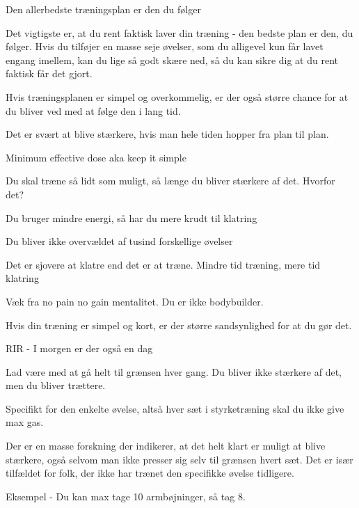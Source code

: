 \begin{multicols}{2}
\begin{tList}{Den allerbedste træningsplan er den du følger}
\item Det vigtigste er, at du rent faktisk laver din træning - den bedste plan er den, du følger. Hvis du tilføjer en masse seje øvelser, som du alligevel kun får lavet engang imellem, kan du lige så godt skære ned, så du kan sikre dig at du rent faktisk får det gjort.
\item Hvis træningsplanen er simpel og overkommelig, er der også større chance for at du bliver ved med at følge den i lang tid.
\item  Det er svært at blive stærkere, hvis man hele tiden hopper fra plan til plan.
\end{tList}



\begin{tList}{Minimum effective dose aka keep it simple}
\item Du skal træne så lidt som muligt, så længe du bliver stærkere af det. Hvorfor det?

\item Du bruger mindre energi, så har du mere krudt til klatring
\item Du bliver ikke overvældet af tusind forskellige øvelser
\item Det er sjovere at klatre end det er at træne. Mindre tid træning, mere tid klatring

\item Væk fra no pain no gain mentalitet. Du er ikke bodybuilder.
\item Hvis din træning er simpel og kort, er der større sandsynlighed for at du gør det.
\end{tList}


\begin{tList}{RIR - I morgen er der også en dag}

\item Lad være med at gå helt til grænsen hver gang. Du bliver ikke stærkere af det, men du bliver trættere.

\item Specifikt for den enkelte øvelse, altså hver sæt i styrketræning skal du ikke give max gas.
\item Der er en masse forskning der indikerer, at det helt klart er muligt at blive stærkere, også selvom man ikke presser sig selv til grænsen hvert sæt. Det er især tilfældet for folk, der ikke har trænet den specifikke øvelse tidligere.
\item Eksempel - Du kan max tage 10 armbøjninger, så tag 8.


\end{tList}
\end{multicols}
